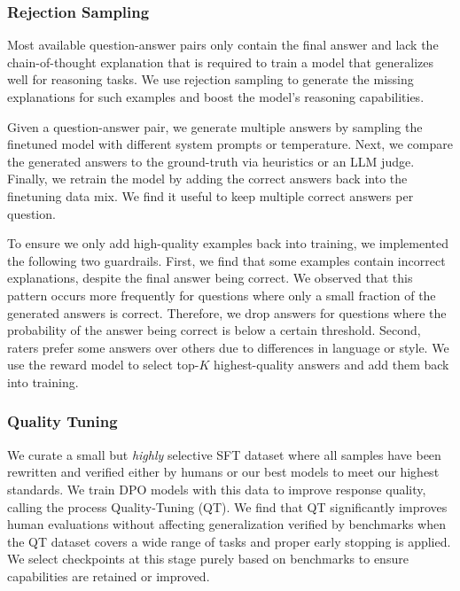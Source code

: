 \subsubsection{Rejection Sampling}
\label{subsubsection:vision_rejection_sampling}
Most available question-answer pairs only contain the final answer and lack the chain-of-thought explanation that is required to train a model that generalizes well for reasoning tasks.
We use rejection sampling to generate the missing explanations for such examples and boost the model's reasoning capabilities.

Given a question-answer pair, we generate multiple answers by sampling the finetuned model with different system prompts or temperature.
Next, we compare the generated answers to the ground-truth via heuristics or an LLM judge.
Finally, we retrain the model by adding the correct answers back into the finetuning data mix. We find it useful to keep multiple correct answers per question.

To ensure we only add high-quality examples back into training, we implemented the following two guardrails.
First, we find that some examples contain incorrect explanations, despite the final answer being correct.
We observed that this pattern occurs more frequently for questions where only a small fraction of the generated answers is correct.
Therefore, we drop answers for questions where the probability of the answer being correct is below a certain threshold.
Second, raters prefer some answers over others due to differences in language or style.
We use the reward model to select top-$K$ highest-quality answers and add them back into training.

\subsubsection{Quality Tuning}
\label{subsubsection:vision_quality_tuning}
We curate a small but \emph{highly} selective SFT dataset where all samples have been rewritten and verified either by humans or our best models to meet our highest standards. We train DPO models with this data to improve response quality, calling the process Quality-Tuning (QT). We find that QT significantly improves human evaluations without affecting generalization verified by benchmarks when the QT dataset covers a wide range of tasks and proper early stopping is applied. We select checkpoints at this stage purely based on benchmarks to ensure capabilities are retained or improved.
